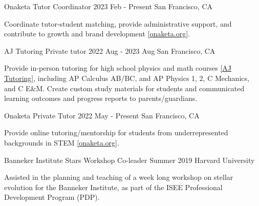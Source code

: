 
\begin{cventries}

  \cventry
    {Onaketa} %
    {Tutor Coordinator} %
    {2023 Feb - Present} %
    {San Francisco, CA} %
    {
        \begin{cvitems} %
            \item[] Coordinate tutor-student matching, provide administrative support, and contribute to growth and brand development \href{https://www.onaketa.org/about}{[onaketa.org]}.
        \end{cvitems}
    }
    
  \cventry
    {AJ Tutoring} %
    {Private tutor} %
    {2022 Aug - 2023 Aug} %
    {San Francisco, CA} %
    {
        \begin{cvitems} %
            \item[] Provide in-person tutoring for high school physics and math courses \href{https://www.ajtutoring.com/meet-our-team/ian-weaver/}{[AJ Tutoring]}, including AP Calculus AB/BC, and AP Physics 1, 2, C Mechanics, and C E\&M. Create custom study materials for students and communicated learning outcomes and progress reports to parents/guardians.
        \end{cvitems}
    }
    
  \cventry
    {Onaketa} %
    {Private Tutor} %
    {2022 May - Present} %
    {San Francisco, CA} %
    {
        \begin{cvitems} %
            \item[] Provide online tutoring/mentorship for students from underrepresented backgrounds in STEM \href{https://www.onaketa.org/about}{[onaketa.org]}.
        \end{cvitems}
    }
    
    
  \cventry
    {Banneker Institute Stars Workshop} %
    {Co-leader} %
    {Summer 2019} %
    {Harvard University} %
    {
        \begin{cvitems} %
            \item[] Assisted in the planning and teaching of a week long workshop on stellar evolution for the Banneker Institute, as part of the ISEE Professional Development Program (PDP).
        \end{cvitems}
    }
    

\end{cventries}
